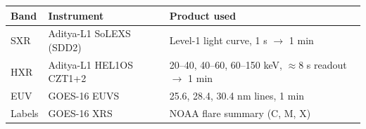 \begin{tabular}{lll}
\toprule
Band & Instrument & Product used \\
\midrule
SXR & Aditya-L1 SoLEXS (SDD2) & Level-1 light curve, 1 s $\rightarrow$ 1 min \\
HXR & Aditya-L1 HEL1OS CZT1+2 & 20--40, 40--60, 60--150 keV, $\approx$8 s readout $\rightarrow$ 1 min \\
EUV & GOES-16 EUVS & 25.6, 28.4, 30.4 nm lines, 1 min \\
Labels & GOES-16 XRS & NOAA flare summary (C, M, X) \\
\bottomrule
\end{tabular}
